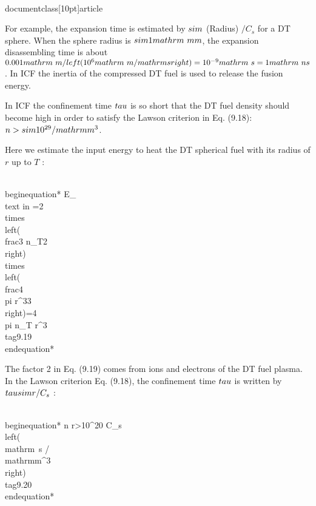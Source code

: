 \\documentclass[10pt]{article}
\begin{document}
{{{{{{For example, the expansion time is estimated by $\\sim$ (Radius) $/ C_{s}$ for a DT sphere. When the sphere radius is $\\sim 1 \\mathrm{~mm}$, the expansion disassembling time is about $0.001 \\mathrm{~m} /\\left(10^{6} \\mathrm{~m} / \\mathrm{s}\\right)=10^{-9} \\mathrm{~s}=1 \\mathrm{~ns}$. In ICF the inertia of the compressed DT fuel is used to release the fusion energy.

In ICF the confinement time $\\tau$ is so short that the DT fuel density should become high in order to satisfy the Lawson criterion in Eq. (9.18): $n>\\sim 10^{29} / \\mathrm{m}^{3}$.

Here we estimate the input energy to heat the DT spherical fuel with its radius of $r$ up to $T$ :


\\begin{equation*}
E_{\\text {in }}=2 \\times\\left(\\frac{3 n_{T}}{2}\\right) \\times\\left(\\frac{4 \\pi r^{3}}{3}\\right)=4 \\pi n_{T} r^{3} \\tag{9.19}
\\end{equation*}


The factor 2 in Eq. (9.19) comes from ions and electrons of the DT fuel plasma. In the Lawson criterion Eq. (9.18), the confinement time $\\tau$ is written by $\\tau \\sim r / C_{s}$ :


\\begin{equation*}
n r>10^{20} C_{s}\\left(\\mathrm{~s} / \\mathrm{m}^{3}\\right) \\tag{9.20}
\\end{equation*}


}}}}}}
\end{document}
